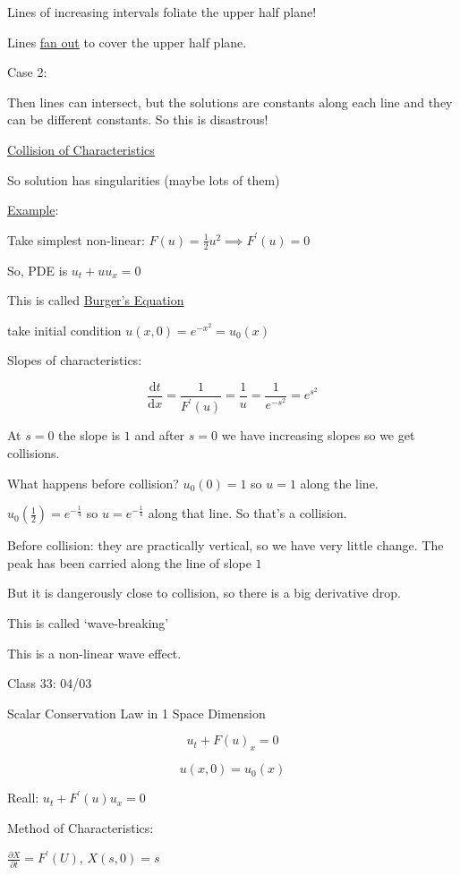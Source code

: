 \documentclass{article}
\theoremstyle{definition}
\begin{document}
Lines of increasing intervals foliate the upper half plane!

Lines \underline{fan out} to cover the upper half plane.

Case 2:

Then lines can intersect, but the solutions are constants along each line and they can be different constants. So this is disastrous!

\underline{Collision of Characteristics} 

So solution has singularities (maybe lots of them)

\underline{Example}:

Take simplest non-linear: \(F(u) = \frac{1}{2}u^2 \implies F^{\prime}(u)=0\)

So, PDE is \(u_t + u u_x = 0\) 

This is called \underline{Burger's Equation}

take initial condition \(u(x,0)=e^{-x^2}=u_0(x)\) 

Slopes of characteristics:

\[
    \frac{\mathrm{d}t}{\mathrm{d}x} = \frac{1}{F^{\prime}(u)} = \frac{1}{u} = \frac{1}{e^{-s^2}} = e^{s^2}
\]

At \(s=0\) the slope is \(1\) and after \(s=0\) we have increasing slopes so we get collisions.

What happens before collision? \(u_0(0)=1\) so \(u=1\) along the line.

\(u_0(\frac{1}{2})=e^{-\frac{1}{4}}\) so \(u=e^{-\frac{1}{4}}\) along that line. So that's a collision.

Before collision: they are practically vertical, so we have very little change. The peak has been carried along the line of slope \(1\) 

But it is dangerously close to collision, so there is a big derivative drop.

This is called `wave-breaking'

This is a non-linear wave effect.

\hrulefill

Class 33: 04/03

Scalar Conservation Law in 1 Space Dimension

\[
    u_t + F(u)_x = 0
\]

\[
    u(x,0)=u_0(x)
\]

Reall: \(u_t + F^{\prime} (u) u_x = 0\)

Method of Characteristics:

\(\frac{\partial X}{\partial t} = F^{\prime} (U)\), \(X(s,0)=s\)
\end{document}
